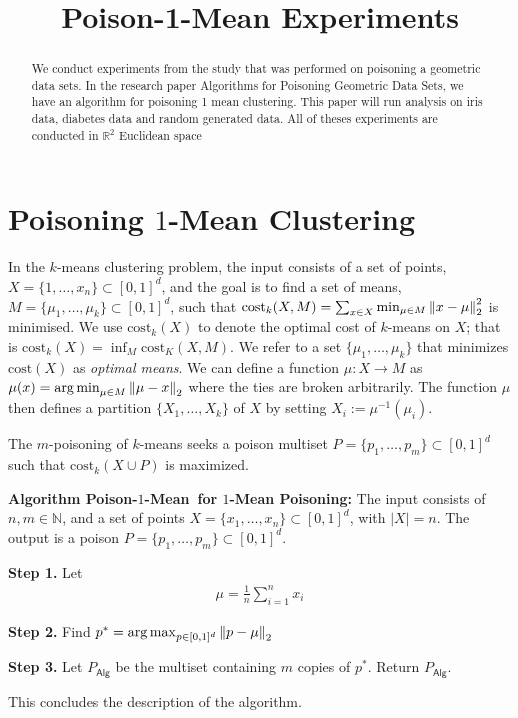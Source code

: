 \documentclass[a4paper,12pt]{article}
\title{Poison-1-Mean Experiments}
\newcommand{\cost}{\mathrm{cost}}
\newcommand{\R}{\mathbb{R}}
\newcommand{\Alg}{\textsf{Alg}}
\newcommand{\AlgOneMean}{\textsf{Poison-$1$-Mean}}
\DeclareMathOperator*{\argmax}{arg\,max}
\DeclareMathOperator*{\argmin}{arg\,min}
\begin{document}
\maketitle


\begin{abstract}
We conduct experiments from the study that was performed on poisoning a geometric data sets.
In the research paper Algorithms for Poisoning Geometric Data Sets, we have an algorithm for
poisoning 1 mean clustering. This paper will run analysis on iris data, diabetes data and random
generated data. All of theses experiments are conducted in $\R^2$ Euclidean space
\end{abstract}

\section{Poisoning $1$-Mean Clustering}
\label{sec:1-mean}

In the $k$-means clustering problem, the input consists of a set of points, $X=\{1,\dots,x_n\}\subset [0,1]^d$, and the goal is to find a set of means, $M=\{\mu_1,\dots, \mu_k\}\subset [0,1]^d$, such that $\cost_k(X,M)=\sum_{x\in X}\min_{\mu\in M}\norm{x-\mu}^2_2$ is minimised. We use $\cost_k(X)$ to denote the optimal cost of $k$-means on $X$; that is
$\cost_k(X)=\inf_{M} \cost_K(X,M)$.
We refer to a set $\{\mu_1,\dots,\mu_k\}$ that minimizes $\cost(X)$ as \emph{optimal means}. We can define a function $\mu:X\to M$ as $\mu(x)=\argmin_{\mu\in M}\norm{\mu-x}_2$ where the ties are broken arbitrarily. The function $\mu$ then defines a partition $\{X_1,\dots,X_k\}$ of $X$ by setting $X_i:=\mu^{-1}(\mu_i)$.

The $m$-poisoning of $k$-means seeks a poison multiset $P=\{p_1,\dots,p_m\}\subset[0,1]^d$ such that $\cost_k(X\cup P)$ is maximized.

\textbf{Algorithm \AlgOneMean~for $1$-Mean Poisoning:}
The input consists of 
$n,m\in \mathbb{N}$,
and a set of points $X=\{x_1,\dots,x_n\}\subset [0,1]^d$,
with $|X|=n$.
The output is a poison $P=\{p_1,\dots,p_m\}\subset [0,1]^d$.
\begin{description}
    \item{\textbf{Step 1.}} 
    Let
    \begin{align*}
        \mu = \frac{1}{n}\sum_{i=1}^n x_i
    \end{align*}
    \item{\textbf{Step 2.}} Find $p^*=\argmax_{p\in [0,1]^d}\norm{p-\mu}_2$
    \item{\textbf{Step 3.}}
    Let $P_\Alg$ be the multiset containing $m$ copies of $p^*$.
    Return $P_\Alg$.
\end{description}
This concludes the description of the algorithm.
\\
\end{document}
